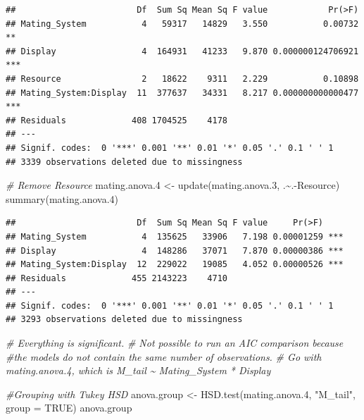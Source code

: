 \documentclass[
  12pt,
]{article}
\newenvironment{Shaded}{\begin{snugshade}}{\end{snugshade}}
\newcommand{\AttributeTok}[1]{\textcolor[rgb]{0.77,0.63,0.00}{#1}}
\newcommand{\CommentTok}[1]{\textcolor[rgb]{0.56,0.35,0.01}{\textit{#1}}}
\newcommand{\ConstantTok}[1]{\textcolor[rgb]{0.00,0.00,0.00}{#1}}
\newcommand{\FloatTok}[1]{\textcolor[rgb]{0.00,0.00,0.81}{#1}}
\newcommand{\FunctionTok}[1]{\textcolor[rgb]{0.00,0.00,0.00}{#1}}
\newcommand{\NormalTok}[1]{#1}
\newcommand{\OtherTok}[1]{\textcolor[rgb]{0.56,0.35,0.01}{#1}}
\newcommand{\SpecialCharTok}[1]{\textcolor[rgb]{0.00,0.00,0.00}{#1}}
\newcommand{\StringTok}[1]{\textcolor[rgb]{0.31,0.60,0.02}{#1}}
\begin{document}
\begin{verbatim}
##                        Df  Sum Sq Mean Sq F value            Pr(>F)    
## Mating_System           4   59317   14829   3.550           0.00732 ** 
## Display                 4  164931   41233   9.870 0.000000124706921 ***
## Resource                2   18622    9311   2.229           0.10898    
## Mating_System:Display  11  377637   34331   8.217 0.000000000000477 ***
## Residuals             408 1704525    4178                              
## ---
## Signif. codes:  0 '***' 0.001 '**' 0.01 '*' 0.05 '.' 0.1 ' ' 1
## 3339 observations deleted due to missingness
\end{verbatim}

\begin{Shaded}
\begin{Highlighting}[]
\CommentTok{\# Remove Resource}
\NormalTok{mating.anova}\FloatTok{.4} \OtherTok{\textless{}{-}} \FunctionTok{update}\NormalTok{(mating.anova}\FloatTok{.3}\NormalTok{, .}\SpecialCharTok{\textasciitilde{}}\NormalTok{.}\SpecialCharTok{{-}}\NormalTok{Resource) }
\FunctionTok{summary}\NormalTok{(mating.anova}\FloatTok{.4}\NormalTok{)}
\end{Highlighting}
\end{Shaded}

\begin{verbatim}
##                        Df  Sum Sq Mean Sq F value     Pr(>F)    
## Mating_System           4  135625   33906   7.198 0.00001259 ***
## Display                 4  148286   37071   7.870 0.00000386 ***
## Mating_System:Display  12  229022   19085   4.052 0.00000526 ***
## Residuals             455 2143223    4710                       
## ---
## Signif. codes:  0 '***' 0.001 '**' 0.01 '*' 0.05 '.' 0.1 ' ' 1
## 3293 observations deleted due to missingness
\end{verbatim}

\begin{Shaded}
\begin{Highlighting}[]
\CommentTok{\# Everything is significant.}
\CommentTok{\# Not possible to run an AIC comparison because }
\CommentTok{\#the models do not contain the same number of observations.}
\CommentTok{\# Go with mating.anova.4, which is M\_tail \textasciitilde{} Mating\_System * Display}
\end{Highlighting}
\end{Shaded}

\begin{Shaded}
\begin{Highlighting}[]
\CommentTok{\#Grouping with Tukey HSD}
\NormalTok{anova.group }\OtherTok{\textless{}{-}} \FunctionTok{HSD.test}\NormalTok{(mating.anova}\FloatTok{.4}\NormalTok{, }\StringTok{"M\_tail"}\NormalTok{, }\AttributeTok{group =} \ConstantTok{TRUE}\NormalTok{)}
\NormalTok{anova.group}
\end{Highlighting}
\end{Shaded}
\end{document}
